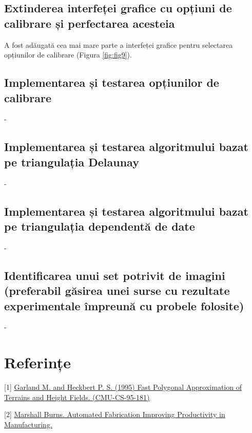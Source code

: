 \documentclass[12pt]{article}
\begin{document}
\subsection{Extinderea interfeței grafice cu opțiuni de calibrare și perfectarea acesteia}

A fost adăugată cea mai mare parte a interfeței grafice pentru selectarea opțiunilor de calibrare (Figura \ref{fig:fig9}). 

\subsection{Implementarea și testarea opțiunilor de calibrare}

-


\subsection{Implementarea și testarea algoritmului bazat pe triangulația Delaunay}

-


\subsection{Implementarea și testarea algoritmului bazat pe triangulația dependentă de date}

-


\subsection{Identificarea unui set potrivit de imagini (preferabil găsirea unei surse cu rezultate experimentale împreună cu probele folosite)}

-



\section*{Referințe}

\medskip

[1] \href{http://reports-archive.adm.cs.cmu.edu/anon/anon/home/ftp/1995/CMU-CS-95-181.pdf} {Garland M. and Heckbert P. S. (1995) Fast Polygonal Approximation of Terrains and Height Fields. (CMU-CS-95-181)}

[2] \href{https://www.fabbers.com/tech/STL_Format#Sct_binary} {Marshall Burns. Automated Fabrication
Improving Productivity in Manufacturing.}
\end{document}

